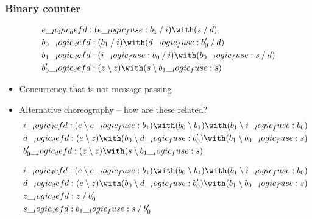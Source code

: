 \subsubsection{Binary counter}

\begin{equation*}
  \begin{lgathered}
    e \defd (e \fuse b_1 \pmir i) \with (z \pmir d) \\
    b_0 \defd (b_1 \pmir i) \with (d \fuse b'_0 \pmir d) \\
    b_1 \defd (i \fuse b_0 \pmir i) \with (b_0 \fuse s \pmir d) \\
    b'_0 \defd (z \limp z) \with (s \limp b_1 \fuse s)
  \end{lgathered}
\end{equation*}

\begin{itemize}
\item Concurrency that is not message-passing
\item Alternative choreography -- how are these related?
\begin{equation*}
  \begin{lgathered}
    i \defd (e \limp e \fuse b_1) \with (b_0 \limp b_1) \with (b_1 \limp i \fuse b_0) \\
    d \defd (e \limp z) \with (b_0 \limp d \fuse b'_0) \with (b_1 \limp b_0 \fuse s) \\
    b'_0 \defd (z \limp z) \with (s \limp b_1 \fuse s)
  \end{lgathered}
\end{equation*}

\begin{equation*}
  \begin{lgathered}
    i \defd (e \limp e \fuse b_1) \with (b_0 \limp b_1) \with (b_1 \limp i \fuse b_0) \\
    d \defd (e \limp z) \with (b_0 \limp d \fuse b'_0) \with (b_1 \limp b_0 \fuse s) \\
    z \defd z \pmir b'_0 \\
    s \defd b_1 \fuse s \pmir b'_0
  \end{lgathered}
\end{equation*}
\end{itemize}


\section{}



